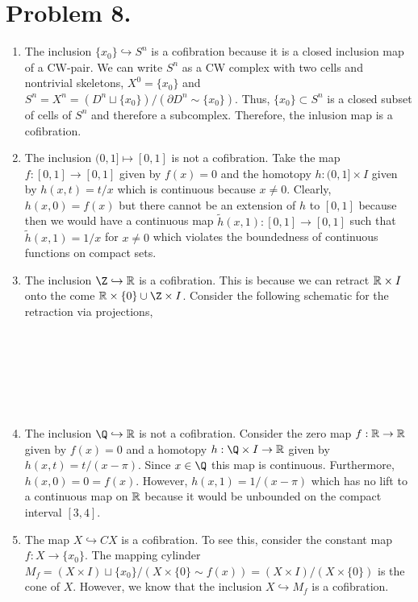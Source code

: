 \documentclass[12pt]{extarticle}
\begin{document}
\newpage

\section*{Problem 8.}

\begin{enumerate}
\item The inclusion $\{x_0 \} \hookrightarrow S^n$ is a cofibration because it is a closed inclusion map of a CW-pair. We can write $S^n$ as a CW complex with two cells and nontrivial skeletons, $X^0 = \{x_0\}$ and $S^n = X^n = (D^n \sqcup \{x_0\}) / (\partial D^n \sim \{x_0\})$. Thus, $\{x_0\} \subset S^n$ is a closed subset of cells of $S^n$ and therefore a subcomplex. Therefore, the inlusion map is a cofibration.

\item The inclusion $(0, 1] \mapsto [0, 1]$ is not a cofibration. Take the map $f : [0, 1] \to [0, 1]$ given by $f(x) = 0$ and the homotopy $h : (0, 1] \times I$ given by $h(x, t) = t/x$ which is continuous because $x \neq 0$. Clearly, $h(x, 0) = f(x)$ but there cannot be an extension of $h$ to $[0, 1]$ because then we would have a continuous map $\tilde{h}(x, 1) : [0, 1] \to [0, 1]$ such that $\tilde{h}(x, 1) = 1/x$ for $x \neq 0$ which violates the boundedness of continuous functions on compact sets.  

\item The inclusion $\Z \hookrightarrow \R$ is a cofibration. This is because we can retract $\mathbb{R} \times I$ onto the come $\R \times \{0\} \cup \Z \times I$. Consider the following schematic for the retraction via projections,
\bigskip \\
\bigskip \\
\bigskip \\
\bigskip \\ 
\bigskip \\ 
\bigskip \\ 
\bigskip \\ 

\item The inclusion $\Q \hookrightarrow \R$ is not a cofibration. Consider the zero map $f : \mathbb{R} \to \mathbb{R}$ given by $f(x) = 0$ and a homotopy $h : \Q \times I \to \R$ given by $h(x, t) = t/(x - \pi)$. Since $x \in \Q$ this map is continuous. Furthermore, $h(x, 0) = 0 = f(x)$. However, $h(x, 1) = 1/(x - \pi)$ which has no lift to a continuous map on $\mathbb{R}$ because it would be unbounded on the compact interval $[3, 4]$.  

\item The map $X \hookrightarrow CX$ is a cofibration. To see this, consider the constant map $f : X \to \{x_0\}$. The mapping cylinder $M_f = (X \times I) \sqcup \{x_0\} / (X \times \{0\} \sim f(x)) = (X \times I)/(X \times \{0\}) $ is the cone of $X$. However, we know that the inclusion $X \hookrightarrow M_f$ is a cofibration. 
\end{enumerate}
\end{document}
